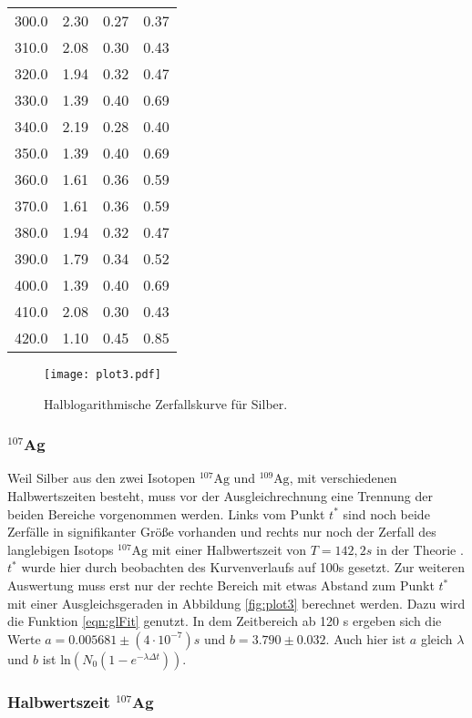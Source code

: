 \begin{table}
\begin{tabular}{c c c c}
  300.0 & 2.30 & 0.27 & 0.37 \\
  310.0 & 2.08 & 0.30 & 0.43 \\
  320.0 & 1.94 & 0.32 & 0.47 \\
  330.0 & 1.39 & 0.40 & 0.69 \\
  340.0 & 2.19 & 0.28 & 0.40 \\
  350.0 & 1.39 & 0.40 & 0.69 \\
  360.0 & 1.61 & 0.36 & 0.59 \\
  370.0 & 1.61 & 0.36 & 0.59 \\
  380.0 & 1.94 & 0.32 & 0.47 \\
  390.0 & 1.79 & 0.34 & 0.52 \\
  400.0 & 1.39 & 0.40 & 0.69 \\
  410.0 & 2.08 & 0.30 & 0.43 \\
  420.0 & 1.10 & 0.45 & 0.85 \\
  \bottomrule
\end{tabular}
\end{table}
\FloatBarrier

\begin{figure}
  \centering
  \texttt{[image: plot3.pdf]}
  \caption{Halblogarithmische Zerfallskurve für Silber.}
  \label{fig:plot2}
\end{figure}
\FloatBarrier

\subsubsection{$^{107}$Ag}

Weil Silber aus den zwei Isotopen $^{107}\text{Ag}$ und $^{109}\text{Ag}$, mit verschiedenen Halbwertszeiten besteht, muss vor der Ausgleichrechnung eine Trennung der beiden Bereiche vorgenommen werden.
Links vom Punkt $t^*$ sind noch beide Zerfälle in signifikanter Größe vorhanden und rechts nur noch der Zerfall des langlebigen Isotops $^{107}\text{Ag}$ mit einer Halbwertszeit von $T = 142,2 s$ in der Theorie \cite{Periode}.
$t^*$ wurde hier durch beobachten des Kurvenverlaufs auf 100s gesetzt.
Zur weiteren Auswertung muss erst nur der rechte Bereich mit etwas Abstand zum Punkt $t^*$ mit einer Ausgleichsgeraden in Abbildung \ref{fig:plot3} berechnet werden.
Dazu wird die Funktion \ref{eqn:glFit} genutzt.
In dem Zeitbereich ab 120 s ergeben sich die Werte $a =  0.005681 \pm (4 \cdot 10^{-7}) s$ und $b = 3.790 \pm 0.032$.
Auch hier ist $a$ gleich $\lambda$ und $b$ ist $\text{ln}(N_0(1-e^{-\lambda \Delta t}))$.

\subsubsection{Halbwertszeit $^{107}$Ag}

